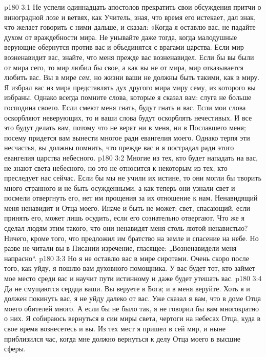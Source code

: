 \vs p180 3:1 Не успели одиннадцать апостолов прекратить свои обсуждения притчи о виноградной лозе и ветвях, как Учитель, зная, что время его истекает, дал знак, что желает говорить с ними дальше, и сказал: «Когда я оставлю вас, не падайте духом от враждебности мира. Не унывайте даже тогда, когда малодушные верующие обернутся против вас и объединятся с врагами царства. Если мир возненавидит вас, знайте, что меня прежде вас возненавидел. Если бы вы были от мира сего, то мир любил бы свое, а как вы не от мира, мир отказывается любить вас. Вы в мире сем, но жизни ваши не должны быть такими, как в миру. Я избрал вас из мира представлять дух другого мира миру сему, из которого вы избраны. Однако всегда помните слова, которые я сказал вам: слуга не больше господина своего. Если смеют меня гнать, будут гнать и вас. Если мои слова оскорбляют неверующих, то и ваши слова будут оскорблять нечестивых. И все это будут делать вам, потому что не верят ни в меня, ни в Пославшего меня; посему придется вам вынести многое ради евангелия моего. Однако терпя эти несчастья, вы должны помнить, что прежде вас и я пострадал ради этого евангелия царства небесного.
\vs p180 3:2 Многие из тех, кто будет нападать на вас, не знают света небесного, но это не относится к некоторым из тех, кто преследует нас сейчас. Если бы мы не учили их истине, то они могли бы творить много странного и не быть осужденными, а как теперь они узнали свет и посмели отвергнуть его, нет им прощения за их отношение к нам. Ненавидящий меня ненавидит и Отца моего. Иначе и быть не может; свет, спасающий, если принять его, может лишь осудить, если его сознательно отвергают. Что же я сделал людям этим такого, что они ненавидят меня столь лютой ненавистью? Ничего, кроме того, что предложил им братство на земле и спасение на небе. Но разве не читали вы в Писании изречение, гласящее: „Возненавидели меня напрасно“.
\vs p180 3:3 Но я не оставлю вас в мире сиротами. Очень скоро после того, как уйду, я пошлю вам духовного помощника. У вас будет тот, кто займет мое место среди вас и научит пути истинному и даже будет утешать вас.
\vs p180 3:4 Да не смущаются сердца ваши. Вы веруете в Бога; и в меня веруйте. Хоть я и должен покинуть вас, я не уйду далеко от вас. Уже сказал я вам, что в доме Отца моего обителей много. А если бы не было так, я не говорил бы вам многократно о них. Я собираюсь вернуться в сии миры света, чертоги на небесах Отца, куда в свое время вознесетесь и вы. Из тех мест я пришел в сей мир, и ныне приблизился час, когда мне должно вернуться к делу Отца моего в высшие сферы.
